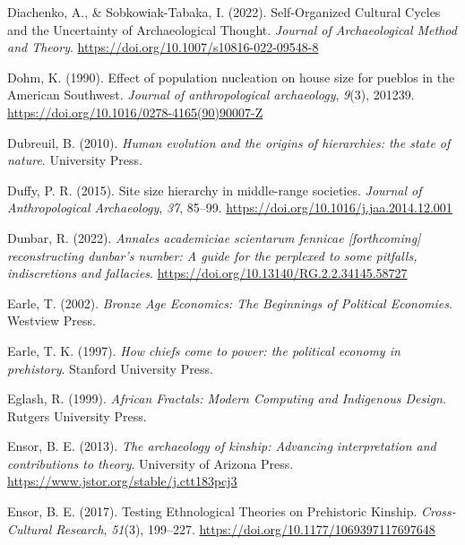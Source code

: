 \documentclass[
  12pt,
]{book}
\newlength{\cslhangindent}
\newlength{\cslentryspacingunit} %
\newenvironment{CSLReferences}[2] %
 {%
  \setlength{\parindent}{0pt}
  \ifodd #1
  \let\oldpar\par
  \def\par{\hangindent=\cslhangindent\oldpar}
  \fi
  \setlength{\parskip}{#2\cslentryspacingunit}
 }%
 {}
\begin{document}
\begin{CSLReferences}{1}{0}
\leavevmode{}%
Diachenko, A., \& Sobkowiak-Tabaka, I. (2022). Self-{Organized Cultural Cycles} and the {Uncertainty} of {Archaeological Thought}. \emph{Journal of Archaeological Method and Theory}. \url{https://doi.org/10.1007/s10816-022-09548-8}

\leavevmode{}%
Dohm, K. (1990). Effect of population nucleation on house size for pueblos in the American Southwest. \emph{Journal of anthropological archaeology}, \emph{9}(3), 201239. \url{https://doi.org/10.1016/0278-4165(90)90007-Z}

\leavevmode{}%
Dubreuil, B. (2010). \emph{Human evolution and the origins of hierarchies: the state of nature}. University Press.

\leavevmode{}%
Duffy, P. R. (2015). Site size hierarchy in middle-range societies. \emph{Journal of Anthropological Archaeology}, \emph{37}, 85--99. \url{https://doi.org/10.1016/j.jaa.2014.12.001}

\leavevmode{}%
Dunbar, R. (2022). \emph{Annales academiciae scientarum fennicae {[}forthcoming{]} reconstructing dunbar's number: A guide for the perplexed to some pitfalls, indiscretions and fallacies}. \url{https://doi.org/10.13140/RG.2.2.34145.58727}

\leavevmode{}%
Earle, T. (2002). \emph{Bronze Age Economics: The Beginnings of Political Economies}. Westview Press.

\leavevmode{}%
Earle, T. K. (1997). \emph{How chiefs come to power: the political economy in prehistory}. Stanford University Press.

\leavevmode{}%
Eglash, R. (1999). \emph{African Fractals: Modern Computing and Indigenous Design}. Rutgers University Press.

\leavevmode{}%
Ensor, B. E. (2013). \emph{The archaeology of kinship: Advancing interpretation and contributions to theory}. University of Arizona Press. \url{https://www.jstor.org/stable/j.ctt183pcj3}

\leavevmode{}%
Ensor, B. E. (2017). Testing Ethnological Theories on Prehistoric Kinship. \emph{Cross-Cultural Research}, \emph{51}(3), 199--227. \url{https://doi.org/10.1177/1069397117697648}


\end{CSLReferences}
\end{document}
